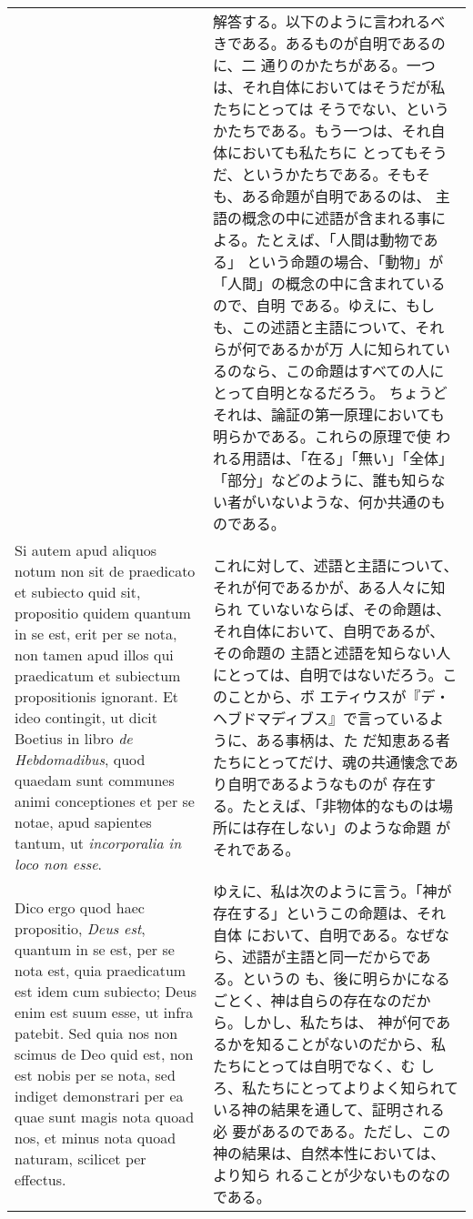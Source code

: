 \documentclass[10pt]{jsarticle}
\begin{document}
\begin{longtable}{p{21em}p{21em}}
&

解答する。以下のように言われるべきである。あるものが自明であるのに、二
通りのかたちがある。一つは、それ自体においてはそうだが私たちにとっては
そうでない、というかたちである。もう一つは、それ自体においても私たちに
とってもそうだ、というかたちである。そもそも、ある命題が自明であるのは、
主語の概念の中に述語が含まれる事による。たとえば、「人間は動物である」
という命題の場合、「動物」が「人間」の概念の中に含まれているので、自明
である。ゆえに、もしも、この述語と主語について、それらが何であるかが万
人に知られているのなら、この命題はすべての人にとって自明となるだろう。
ちょうどそれは、論証の第一原理においても明らかである。これらの原理で使
われる用語は、「在る」「無い」「全体」「部分」などのように、誰も知らな
い者がいないような、何か共通のものである。

\\

Si autem apud aliquos notum non sit de praedicato et subiecto quid
sit, propositio quidem quantum in se est, erit per se nota, non tamen
apud illos qui praedicatum et subiectum propositionis ignorant. Et
ideo contingit, ut dicit Boetius in libro {\it de Hebdomadibus}, quod
quaedam sunt communes animi conceptiones et per se notae, apud
sapientes tantum, ut {\it incorporalia in loco non esse}.

&

これに対して、述語と主語について、それが何であるかが、ある人々に知られ
ていないならば、その命題は、それ自体において、自明であるが、その命題の
主語と述語を知らない人にとっては、自明ではないだろう。このことから、ボ
エティウスが『デ・ヘブドマディブス』で言っているように、ある事柄は、た
だ知恵ある者たちにとってだけ、魂の共通懐念であり自明であるようなものが
存在する。たとえば、「非物体的なものは場所には存在しない」のような命題
がそれである。

\\

Dico ergo quod haec propositio, {\it Deus est}, quantum in se est, per
se nota est, quia praedicatum est idem cum subiecto; Deus enim est
suum esse, ut infra patebit. Sed quia nos non scimus de Deo quid est,
non est nobis per se nota, sed indiget demonstrari per ea quae sunt
magis nota quoad nos, et minus nota quoad naturam, scilicet per
effectus.

&

ゆえに、私は次のように言う。「神が存在する」というこの命題は、それ自体
において、自明である。なぜなら、述語が主語と同一だからである。というの
も、後に明らかになるごとく、神は自らの存在なのだから。しかし、私たちは、
神が何であるかを知ることがないのだから、私たちにとっては自明でなく、む
しろ、私たちにとってよりよく知られている神の結果を通して、証明される必
要があるのである。ただし、この神の結果は、自然本性においては、より知ら
れることが少ないものなのである。


\end{longtable}
\end{document}

